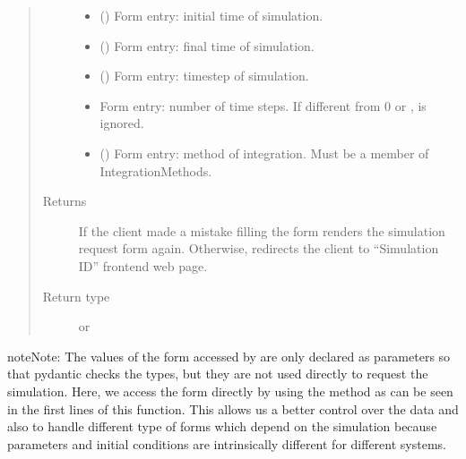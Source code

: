 \documentclass[a4paper,landscape,10pt,english]{sphinxmanual}
\begin{document}
\begin{fulllineitems}
\begin{quote}
\begin{description}
\begin{itemize}
\item {} 
 () \textendash{} Form entry: initial time of simulation.

\item {} 
 () \textendash{} Form entry: final time of simulation.

\item {} 
 () \textendash{} Form entry: timestep of simulation.

\item {} 
 \textendash{} Form entry: number of time steps. If different from 0 or ,
 is ignored.

\item {} 
 ({\hyperref[\detokenize{code_docs/simulation_api.controller:simulation_api.controller.schemas.IntegrationMethods}]{}}) \textendash{} Form entry: method of integration. Must be a member of
IntegrationMethods.

\end{itemize}

\item[{Returns}] \leavevmode
If the client made a mistake filling the form renders the simulation
request form again. Otherwise, redirects the client to “Simulation ID”
frontend web page.

\item[{Return type}] \leavevmode
{} or 

\end{description}\end{quote}

\begin{sphinxadmonition}{note}{Note:}
The values of the form accessed by  are only
declared as parameters so that pydantic checks the types, but they are not
used directly to request the simulation.
Here, we access the form directly
by using the method  as can be seen in the
first lines of this function. This allows us a better control over the data
and also to handle different type of forms \textendash{}which depend on the simulation
because parameters and initial conditions are intrinsically different for
different systems.
\end{sphinxadmonition}

\end{fulllineitems}
\end{document}
